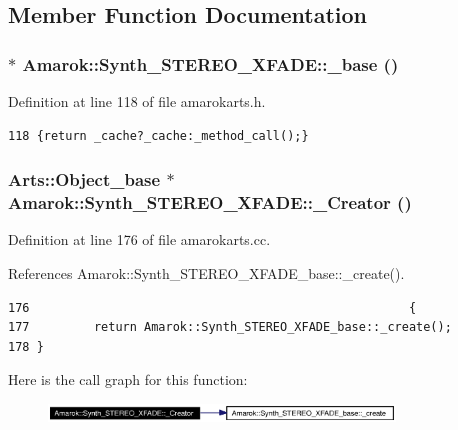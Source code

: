 \subsection{Member Function Documentation}
\subsubsection{$\ast$ Amarok::Synth\_\-STEREO\_\-XFADE::\_\-base ()\hspace{0.3cm}{\tt  [inline]}}\label{classAmarok_1_1Synth__STEREO__XFADE_Amarok_1_1Synth__STEREO__XFADEa8}




Definition at line 118 of file amarokarts.h.



\footnotesize\begin{verbatim}118 {return _cache?_cache:_method_call();}
\end{verbatim}\normalsize 
{}
\subsubsection{\setlength{\rightskip}{0pt plus 5cm}Arts::Object\_\-base $\ast$ Amarok::Synth\_\-STEREO\_\-XFADE::\_\-Creator ()\hspace{0.3cm}{\tt  [static, private]}}\label{classAmarok_1_1Synth__STEREO__XFADE_Amarok_1_1Synth__STEREO__XFADEh0}




Definition at line 176 of file amarokarts.cc.

References Amarok::Synth\_\-STEREO\_\-XFADE\_\-base::\_\-create().



\footnotesize\begin{verbatim}176                                                     {
177         return Amarok::Synth_STEREO_XFADE_base::_create();
178 }
\end{verbatim}\normalsize 


Here is the call graph for this function:\begin{figure}[H]
\begin{center}
\leavevmode
\includegraphics[width=261pt]{classAmarok_1_1Synth__STEREO__XFADE_Amarok_1_1Synth__STEREO__XFADEh0_cgraph}
\end{center}
\end{figure}
